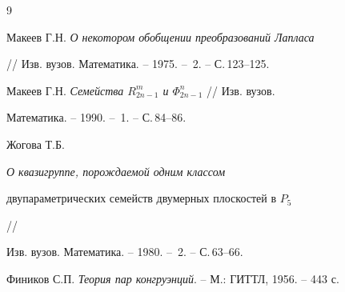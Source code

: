 \begin{thebibliography}{9} 


 




Макеев Г.Н. {\em О некотором обобщении преобразований Лапласа} 


// Изв. вузов. Математика. -- 1975. -- \No\,2. -- С.\,123--125. 




Макеев Г.Н. {\em Семейства $R^m_{2n-1}$ и $\Phi^n_{2n-1}$} // Изв. вузов. 


Математика. -- 1990. -- \No\,1. -- С.\,84--86. 




Жогова Т.Б. {\em О квазигруппе, порождаемой одним классом 


двупараметрических семейств двумерных плоскостей в $P_5$} // 


Изв. вузов. Математика. -- 1980. -- \No\,2. -- С.\,63--66. 




Фиников С.П. {\em Теория пар конгруэнций}. -- М.: ГИТТЛ, 1956. -- 443 с. 


 


\end{thebibliography} 


 


\vskip 2cm 


 






 


\label{end} 


 


